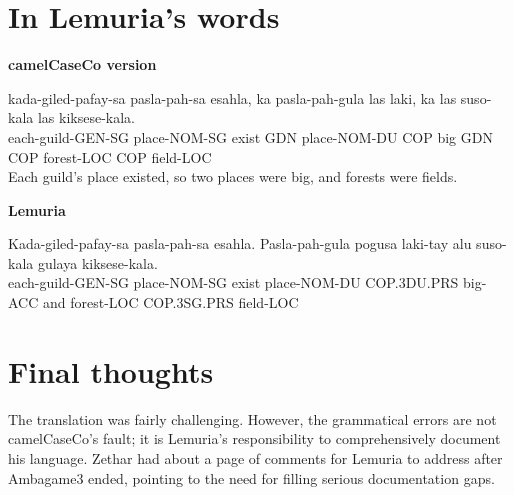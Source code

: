 \documentclass{thiguka}
\begin{document}
\section{In Lemuria's words}
\textbf{camelCaseCo version}
\begin{exe}
    \ex{} \gll{}kada-giled-pafay-sa pasla-pah-sa esahla, ka pasla-pah-gula las laki, ka las suso-kala las kiksese-kala.\\
                each-guild-GEN-SG place-NOM-SG exist GDN place-NOM-DU COP big GDN COP forest-LOC COP field-LOC\\
          \glt{}Each guild's place existed, so two places were big, and forests were fields.
\end{exe}

\textbf{Lemuria}
\begin{exe}
    \ex{} \gll{}Kada-giled-pafay-sa pasla-pah-sa esahla. Pasla-pah-gula pogusa      laki-tay alu suso-kala  gulaya      kiksese-kala.\\
                each-guild-GEN-SG   place-NOM-SG exist   place-NOM-DU   COP.3DU.PRS big-ACC  and forest-LOC COP.3SG.PRS field-LOC\\
          \glt{}
\end{exe}

\section{Final thoughts}
The translation was fairly challenging.
However, the grammatical errors are not camelCaseCo's fault; it is Lemuria's responsibility to comprehensively document his language.
Zethar had about a page of comments for Lemuria to address after Ambagame3 ended, pointing to the need for filling serious documentation gaps.
\end{document}
